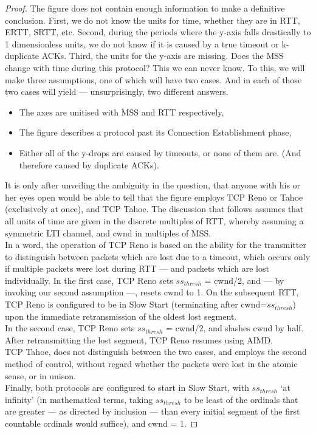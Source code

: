 \documentclass[../main.tex]{subfiles}
\begin{document}
\begin{proof}
The figure does not contain enough information to make a definitive conclusion. First, we do not know the units for time, whether they are in RTT, ERTT, SRTT, etc. Second, during the periods where the y-axis falls drastically to 1 dimensionless units, we do not know if it is caused by a true timeout or k-duplicate ACKs. Third, the units for the y-axis are missing. Does the MSS change with time during this protocol? This we can never know. To this, we will make three assumptions, one of which will have two cases. And in each of those two cases will yield — unsurprisingly, two different answers.
\begin{itemize}
    \item The axes are unitised with MSS and RTT respectively,
    \item The figure describes a protocol past its Connection Establishment phase,
    \item Either all of the y-drops are caused by timeouts, or none of them are. (And therefore caused by duplicate ACKs).
\end{itemize}

It is only after unveiling the ambiguity in the question, that anyone with his or her eyes open would be able to tell that the figure employs TCP Reno or Tahoe (exclusively at once), and TCP Tahoe. The discussion that follows assumes that all units of time are given in the discrete multiples of RTT, whereby assuming a symmetric LTI channel, and cwnd in multiples of MSS.\\

In a word, the operation of TCP Reno is based on the ability for the transmitter to distinguish between packets which are lost due to a timeout, which occurs only if multiple packets were lost during RTT — and packets which are lost individually. In the first case, TCP Reno sets ${ss}_{thresh}$ = cwnd/2, and — by invoking our second assumption —, resets cwnd to 1. On the subsequent RTT, TCP Reno is configured to be in Slow Start (terminating after cwnd=${ss}_{thresh}$) upon the immediate retransmission of the oldest lost segment.\\

In the second case, TCP Reno sets ${ss}_{thresh}$ = cwnd/2, and slashes cwnd by half. After retransmitting the lost segment, TCP Reno resumes using AIMD.\\

TCP Tahoe, does not distinguish between the two cases, and employs the second method of control, without regard whether the packets were lost in the atomic sense, or in unison.\\

Finally, both protocols are configured to start in Slow Start, with ${ss}_{thresh}$ ‘at infinity’ (in mathematical terms, taking ${ss}_{thresh}$ to be least of the ordinals that are greater — as directed by inclusion — than every initial segment of the first countable ordinals would suffice), and cwnd = 1.
\end{proof}
\end{document}
